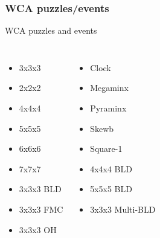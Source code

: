 \documentclass{beamer}
\begin{document}
            \subsubsection{WCA puzzles/events}

                \begin{frame}{WCA puzzles and events}
                    \begin{columns}[c] 
                            \begin{itemize}
                                \item 3x3x3 \pause{}
                                \item 2x2x2 \pause{}
                                \item 4x4x4 \pause{}
                                \item 5x5x5 \pause{}
                                \item 6x6x6 \pause{}
                                \item 7x7x7 \pause{}
                                \item 3x3x3 BLD \pause{}
                                \item 3x3x3 FMC \pause{}
                                \item 3x3x3 OH \pause{}
                            \end{itemize}
                            \begin{itemize}
                                \item Clock \pause{}
                                \item Megaminx \pause{}
                                \item Pyraminx \pause{}
                                \item Skewb \pause{}
                                \item Square-1 \pause{}
                                \item 4x4x4 BLD \pause{}
                                \item 5x5x5 BLD \pause{}
                                \item 3x3x3 Multi-BLD \pause{}
                            \end{itemize}


\end{columns}
\end{frame}
\end{document}
